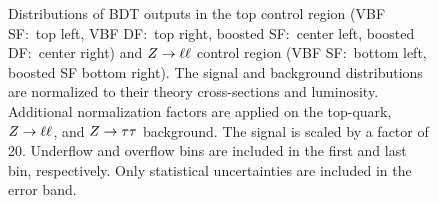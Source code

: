 \begin{figure}[htb]
\begin{subfigure}[t]{0.45\textwidth}
    \end{subfigure}
    \caption{Distributions of BDT outputs in the top control region (VBF SF:\ top left, VBF DF:\ top right, boosted SF:\ center left, boosted DF:\ center right)
             and $Z \to \ell \ell$ control region (VBF SF:\ bottom left, boosted SF\: bottom right).
             The signal and background distributions are normalized to their theory cross-sections and luminosity.
             Additional normalization factors are applied on the top-quark, $Z \to \ell \ell$, and $Z \to \tau \tau$ background.
             The signal is scaled by a factor of 20.
             Underflow and overflow bins are included in the first and last bin, respectively.
             Only statistical uncertainties are included in the error band.}\label{fig:mva:modeling:cr:bdts}
\end{figure}

